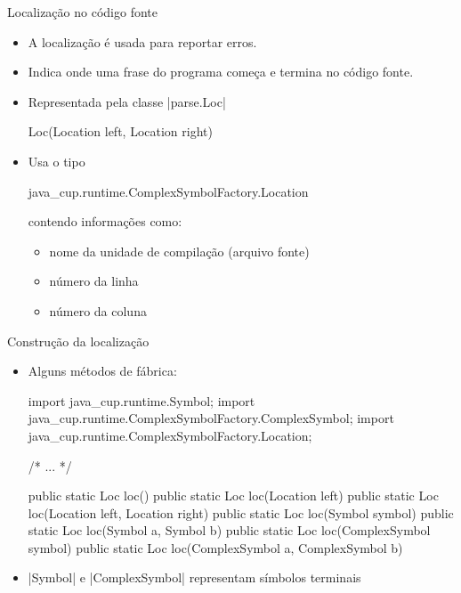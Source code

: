 \documentclass[smaller]{beamer}
\begin{document}
\begin{frame}{Localização no código fonte}
  \begin{itemize}
    \item A localização é usada para reportar erros.
    \item Indica onde uma frase do programa começa e termina no código
    fonte.
    \item Representada pela classe \pyginline|parse.Loc|
    \begin{pygmented}[lang=java]
Loc(Location left, Location right)
    \end{pygmented}
    \item Usa o tipo
    \begin{pygmented}[lang=java]
java_cup.runtime.ComplexSymbolFactory.Location
    \end{pygmented}
    contendo informações como:
    \begin{itemize}
      \item nome da unidade de compilação (arquivo fonte)
      \item número da linha
      \item número da coluna
    \end{itemize}
  \end{itemize}
\end{frame}

\begin{frame}{Construção da localização}
  \begin{itemize}
    \item Alguns métodos de fábrica:
\begin{pygmented}[]
import java_cup.runtime.Symbol;
import java_cup.runtime.ComplexSymbolFactory.ComplexSymbol;
import java_cup.runtime.ComplexSymbolFactory.Location;

/* ... */

public static Loc loc()
public static Loc loc(Location left)
public static Loc loc(Location left, Location right)
public static Loc loc(Symbol symbol)
public static Loc loc(Symbol a, Symbol b)
public static Loc loc(ComplexSymbol symbol)
public static Loc loc(ComplexSymbol a, ComplexSymbol b)
\end{pygmented}
    
    \item \pyginline|Symbol| e \pyginline|ComplexSymbol| representam
    símbolos terminais
  \end{itemize}
\end{frame}
\end{document}
